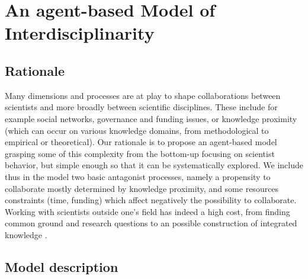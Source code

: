 \documentclass[utf8,11pt]{article}
\begin{document}
\section{An agent-based Model of Interdisciplinarity}

\subsection{Rationale}

Many dimensions and processes are at play to shape collaborations between scientists and more broadly between scientific disciplines. These include for example social networks, governance and funding issues, or knowledge proximity (which can occur on various knowledge domains, from methodological to empirical or theoretical). Our rationale is to propose an agent-based model grasping some of this complexity from the bottom-up focusing on scientist behavior, but simple enough so that it can be systematically explored. We include thus in the model two basic antagonist processes, namely a propensity to collaborate mostly determined by knowledge proximity, and some resources constraints (time, funding) which affect negatively the possibility to collaborate. Working with scientists outside one's field has indeed a high cost, from finding common ground and research questions to an possible construction of integrated knowledge \cite{frodeman2013sustainable}.


\subsection{Model description}
\end{document}

